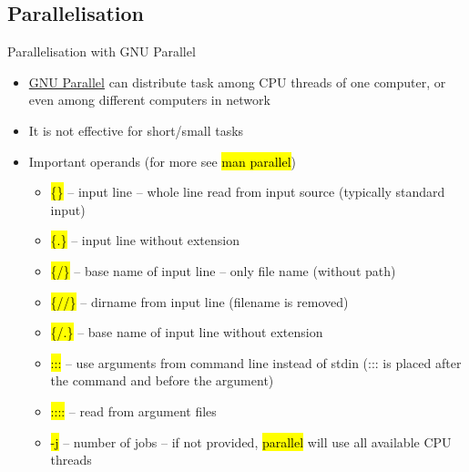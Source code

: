 \documentclass[compress, ucs, xelatex, 11pt, xcolor=svgnames,
  hyperref={
    bookmarks=true,
    unicode=true,
    colorlinks=true,
    pdftitle={Linux, command line and MetaCentrum},
    plainpages=false,
    pdfauthor={Vojtech Zeisek},
    pdfsubject={Course about use of Linux command line, writing shell scripts and using MetaCentrum of CESNET},
    pdfcreator={XeLaTeX},
    pdfkeywords={Linux, GNU, BASH, shell, command line, MetaCentrum},
    linkcolor=DarkRed,
    anchorcolor=DarkBlue,
    citecolor=Indigo,
    filecolor=NavyBlue,
    menucolor=DarkMagenta,
    urlcolor=DarkBlue,
    pdftex},
  url={hyphens, lowtilde} %
  ]{beamer}
\renewcommand{\texttt}[1]{\hl{\ttfamily #1}}
\begin{document}
\subsection{Parallelisation}

\begin{frame}{Parallelisation with GNU Parallel}
  \begin{itemize}
    \item \href{https://www.gnu.org/software/parallel/}{GNU Parallel} can distribute task among CPU threads of one computer, or even among different computers in network
    \item It is not effective for short/small tasks
    \item Important operands (for more see \texttt{man parallel})
    \begin{itemize}
      \item \texttt{\{\}} -- input line -- whole line read from input source (typically standard input)
      \item \texttt{\{.\}} -- input line without extension
      \item \texttt{\{/\}} -- base name of input line -- only file name (without path)
      \item \texttt{\{//\}} -- dirname from input line (filename is removed)
      \item \texttt{\{/.\}} -- base name of input line without extension
      \item \texttt{:::} -- use arguments from command line instead of stdin (::: is placed after the command and before the argument)
      \item \texttt{::::} -- read from argument files
      \item \texttt{-j} -- number of jobs -- if not provided, \texttt{parallel} will use all available CPU threads
    \end{itemize}
  \end{itemize}
\end{frame}
\end{document}

